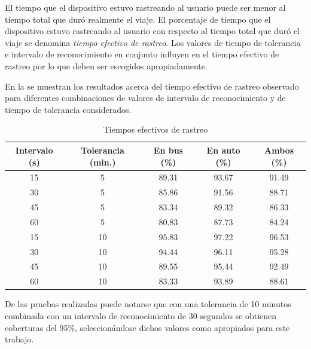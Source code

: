 El tiempo que el dispositivo estuvo rastreando al usuario puede ser menor al tiempo total que duró realmente el viaje. El porcentaje de tiempo que el dispositivo estuvo rastreando al usuario con respecto al tiempo total que duró el viaje se denomina \emph{tiempo efectivo de rastreo}. Los valores de tiempo de tolerancia e intervalo de reconocimiento en conjunto influyen en el tiempo efectivo de rastreo por lo que deben ser escogidos apropiadamente.

En la  se muestran los resultados acerca del tiempo efectivo de rastreo observado para diferentes combinaciones de valores de intervalo de reconocimiento y de tiempo de tolerancia considerados. 

\begin{table}[h]
    \centering
	\begin{tabular}{ccccc}
    	\toprule
    	Intervalo (s) & Tolerancia (min.) & En bus (\%) & En auto (\%) & Ambos (\%) \\
    	\midrule
    	15            & 5                 & 89.31         & 93.67          & 91.49        \\
    	30            & 5                 & 85.86         & 91.56          & 88.71        \\
    	45            & 5                 & 83.34         & 89.32          & 86.33        \\
    	60            & 5                 & 80.83         & 87.73          & 84.24        \\
    	15            & 10                & 95.83         & 97.22          & 96.53        \\
    	30            & 10                & 94.44         & 96.11          & 95.28        \\
    	45            & 10                & 89.55         & 95.44          & 92.49        \\
    	60            & 10                & 83.33         & 93.89          & 88.61        \\
    	\bottomrule
	\end{tabular}
    \caption{Tiempos efectivos de rastreo}
    \label{tab:prom_tiempo_efectivo_rastreo}
\end{table}

De las pruebas realizadas puede notarse que con una tolerancia de 10 minutos combinada con un intervalo de reconocimiento de 30 segundos se obtienen coberturas del 95\%, seleccionándose dichos valores como apropiados para este trabajo.

